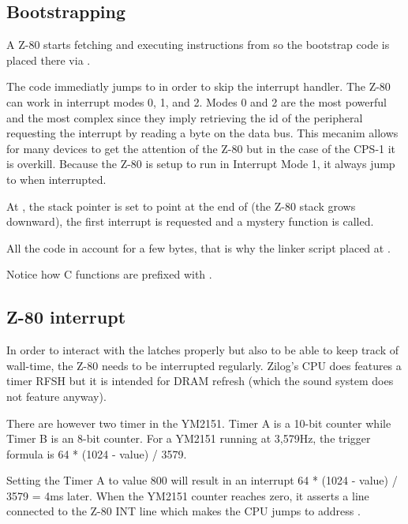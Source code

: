 \subsection{Bootstrapping}
A Z-80 starts fetching and executing instructions from  so the bootstrap code  is placed there via .

The code immediatly jumps to  in order to skip the interrupt handler. The Z-80 can work in interrupt modes 0, 1, and 2. Modes 0 and 2 are the most powerful and the most complex since they imply retrieving the id of the peripheral requesting the interrupt by reading a byte on the data bus. This mecanim allows for many devices to get the attention of the Z-80 but in the case of the CPS-1 it is overkill. Because the Z-80 is setup to run in Interrupt Mode 1, it always jump to  when interrupted.

At , the stack pointer  is set to point at the end of  (the Z-80 stack grows downward), the first interrupt is requested and a mystery  function is called.

All the code in  account for a few bytes, that is why the linker script placed  at .

Notice how C functions are prefixed with \icode{\_}.










\subsection{Z-80 interrupt}
In order to interact with the latches properly but also to be able to keep track of wall-time, the Z-80 needs to be interrupted regularly. Zilog's CPU does features a timer RFSH but it is intended for DRAM refresh (which the sound system does not feature anyway).

There are however two timer in the YM2151. Timer A is a 10-bit counter while Timer B is an 8-bit counter. For a YM2151 running at 3,579Hz, the trigger formula is 64 * (1024 - value) / 3579.

Setting the Timer A to value 800 will result in an interrupt 64 * (1024 - value) / 3579 = 4ms later. When the YM2151 counter reaches zero, it asserts a line connected to the Z-80 INT line which makes the CPU jumps to address .

